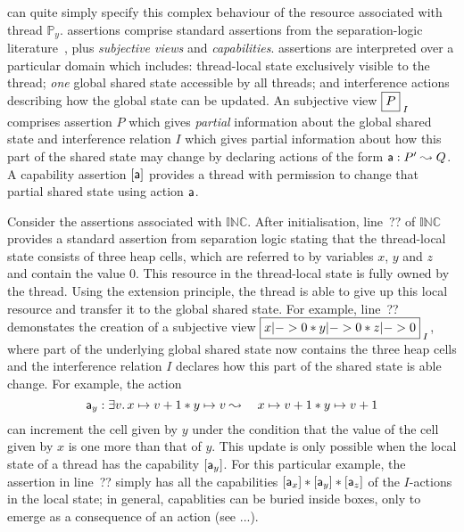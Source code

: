 \colosl
can quite simply specify this complex behaviour of the
resource associated with thread
$\mathbb{P}_y$. 
\colosl assertions comprise  standard assertions from the
separation-logic literature~\cite{rey02,sepish,variablesasresource},
plus {\em subjective views} and {\em capabilities}. \colosl
assertions are interpreted over a particular domain which includes:
{thread-local} state exclusively visible to the thread; {\em one}
global shared state accessible by all threads; and { interference
actions}  describing how the global state can be updated. An 
subjective view  $\shared{P} I$ comprises assertion $P$ which
gives {\em partial} information about the global
shared state and interference relation $I$  which gives partial
information about  how this
part of the shared state may change by declaring actions of the form  $\mathsf{a} :
P' \mathrel{\leadsto} Q$.  A capability assertion $[\mathsf{a}]$ provides a thread with permission to 
change that partial shared state using action $\mathsf{a}$.




Consider the \colosl assertions associated with $\mathbb{INC}$.
After
initialisation, line~?? of $\mathbb{INC}$  provides a standard
assertion from separation logic stating that 
the thread-local state consists of three  heap cells,  which are
referred to by  variables $x$,
$y$ and $z$ and contain the value  $0$. This resource in the thread-local state is
fully owned by  the thread. Using the extension principle, the thread is able to give up  this local
resource and transfer it  to the global shared state. For example, line~?? demonstates the
creation of a subjective view $\shared{x|-> 0 * y|-> 0 * z|->
  0}I$, where {part} of the underlying
global shared state now contains the three heap cells and the 
interference relation $I$ declares  how  this  part of the  shared state  is able 
change. For example,  the action 
\[
 \mathsf{a}_y:  \exists v.\, x \mapsto v+1 * y \mapsto v \mathrel{\leadsto} 
    \quad x \mapsto v+1 * y \mapsto v+1
\]
can increment  the cell given by $y$ under the condition that the
value of the  cell
given by $x$ is one more than that of $y$. 
This update is only possible when the
local state of a thread has the { capability} $[\mathsf{a}_y]$. For  this
particular 
example, the assertion in line~?? simply has all the capabilities $[\mathsf{a}_x] * [\mathsf{a}_y] * [\mathsf{a}_z]$ of the $I$-actions   in the local state; in general,
capablities can be buried inside boxes, only to emerge as a
consequence of an action
(see  ...). 



